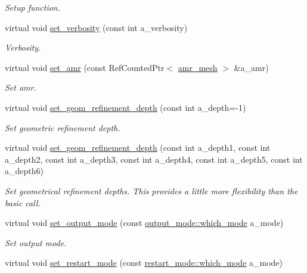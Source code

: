 \begin{DoxyCompactItemize}
\begin{DoxyCompactList}\small\item\em Setup function. \end{DoxyCompactList}\item 
virtual void \hyperlink{classplasma__engine_a2063be18a94443139957a48c426c2acb}{set\+\_\+verbosity} (const int a\+\_\+verbosity)
\begin{DoxyCompactList}\small\item\em Verbosity. \end{DoxyCompactList}\item 
virtual void \hyperlink{classplasma__engine_a7f445d7883abc938ebb05cb16d4c7d4b}{set\+\_\+amr} (const Ref\+Counted\+Ptr$<$ \hyperlink{classamr__mesh}{amr\+\_\+mesh} $>$ \&a\+\_\+amr)
\begin{DoxyCompactList}\small\item\em Set amr. \end{DoxyCompactList}\item 
virtual void \hyperlink{classplasma__engine_a97c9b09d3600d3b2866f2a9e6ad6cbff}{set\+\_\+geom\+\_\+refinement\+\_\+depth} (const int a\+\_\+depth=-\/1)
\begin{DoxyCompactList}\small\item\em Set geometric refinement depth. \end{DoxyCompactList}\item 
virtual void \hyperlink{classplasma__engine_ad085dbdfcc2b15bcdc5e409f30794b0a}{set\+\_\+geom\+\_\+refinement\+\_\+depth} (const int a\+\_\+depth1, const int a\+\_\+depth2, const int a\+\_\+depth3, const int a\+\_\+depth4, const int a\+\_\+depth5, const int a\+\_\+depth6)
\begin{DoxyCompactList}\small\item\em Set geometrical refinement depths. This provides a little more flexibility than the basic call. \end{DoxyCompactList}\item 
virtual void \hyperlink{classplasma__engine_a97a5d75fe34ac3fb765cc6bbcb8c9d51}{set\+\_\+output\+\_\+mode} (const \hyperlink{namespaceoutput__mode_ad0fdcb2c9bc1b66e01306939b1bf5cf7}{output\+\_\+mode\+::which\+\_\+mode} a\+\_\+mode)
\begin{DoxyCompactList}\small\item\em Set output mode. \end{DoxyCompactList}\item 
virtual void \hyperlink{classplasma__engine_aad30424dd9a3ed192e62f1684fae7e2c}{set\+\_\+restart\+\_\+mode} (const \hyperlink{namespacerestart__mode_aa9c13b092e65386120f08a8862e576ee}{restart\+\_\+mode\+::which\+\_\+mode} a\+\_\+mode)

\end{DoxyCompactItemize}

